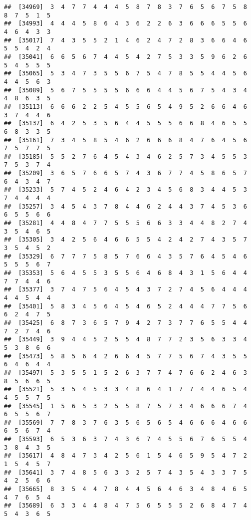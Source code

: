 \documentclass[
]{book}
\begin{document}
\begin{verbatim}
##  [34969]  3  4  7  7  4  4  4  5  8  7  8  3  7  6  5  6  7  5  8  8  7  5  1  5
##  [34993]  4  4  4  5  8  6  4  3  6  2  2  6  3  6  6  6  5  5  6  4  6  4  3  3
##  [35017]  7  4  3  5  5  2  1  4  6  2  4  7  2  8  3  6  6  4  6  5  5  4  2  4
##  [35041]  6  6  5  6  7  4  4  5  4  2  7  5  3  3  5  9  6  2  6  5  4  5  5  5
##  [35065]  5  3  4  7  3  5  5  6  7  5  4  7  8  5  5  4  4  5  6  4  4  5  6  3
##  [35089]  5  6  7  5  5  5  5  6  6  6  4  4  5  6  7  5  4  3  4  4  8  6  3  5
##  [35113]  6  6  6  2  2  5  4  5  5  6  5  4  9  5  2  6  6  4  6  3  7  4  4  6
##  [35137]  6  4  2  5  3  5  6  4  4  5  5  5  6  6  8  4  6  5  5  6  8  3  3  5
##  [35161]  7  3  4  5  8  5  4  6  2  6  6  6  8  4  7  6  4  5  6  7  5  7  7  5
##  [35185]  5  5  2  7  6  4  5  4  3  4  6  2  5  7  3  4  5  5  3  7  5  3  7  4
##  [35209]  3  6  5  7  6  6  5  7  4  3  6  7  7  4  5  8  6  5  7  6  4  3  4  7
##  [35233]  5  7  4  5  2  4  6  4  2  3  4  5  6  8  3  4  4  5  3  7  4  4  4  4
##  [35257]  3  4  5  4  3  7  8  4  4  6  2  4  4  3  7  4  5  3  6  6  5  5  6  6
##  [35281]  4  4  8  4  7  7  5  5  5  6  6  3  3  4  4  8  2  7  4  3  5  4  6  5
##  [35305]  3  4  2  5  6  4  6  6  5  5  4  2  4  2  7  4  3  5  7  3  5  4  5  2
##  [35329]  6  7  7  7  5  8  5  7  6  6  4  3  5  7  6  4  5  4  6  5  5  5  6  7
##  [35353]  5  6  4  5  5  3  5  5  6  4  6  8  4  3  1  5  6  4  4  7  7  4  4  6
##  [35377]  3  7  4  7  5  6  4  5  4  3  7  2  7  4  5  6  4  4  4  4  4  5  4  4
##  [35401]  5  8  3  4  5  6  4  5  4  6  5  2  4  4  4  7  7  5  6  6  2  4  7  5
##  [35425]  6  8  7  3  6  5  7  9  4  2  7  3  7  7  6  5  5  4  4  7  2  7  4  6
##  [35449]  3  9  4  4  5  2  5  5  4  8  7  7  2  3  5  6  3  3  4  5  3  8  6  6
##  [35473]  5  8  5  6  4  2  6  6  4  5  7  7  5  6  7  4  3  5  5  6  4  6  4  4
##  [35497]  5  3  5  5  1  5  2  6  3  7  7  4  7  6  6  2  4  6  3  8  5  6  6  5
##  [35521]  5  3  5  4  5  3  3  4  8  6  4  1  7  7  4  4  6  5  4  4  5  5  7  5
##  [35545]  1  5  6  5  3  2  5  5  8  7  5  7  3  4  6  6  6  7  4  6  5  5  6  7
##  [35569]  7  7  8  3  7  6  3  5  6  5  6  5  4  6  6  6  4  6  6  6  5  6  7  4
##  [35593]  6  5  3  6  3  7  4  3  6  7  4  5  5  6  7  6  5  5  4  3  8  4  3  5
##  [35617]  4  8  4  7  3  4  2  5  6  1  5  4  6  5  9  5  4  7  2  1  5  4  5  7
##  [35641]  3  7  4  8  5  6  3  3  2  5  7  4  3  5  4  3  3  7  5  4  2  5  6  6
##  [35665]  8  3  5  4  4  7  8  4  4  5  6  4  6  3  4  8  4  6  5  4  7  6  5  4
##  [35689]  6  3  3  4  4  8  4  7  5  6  5  5  5  2  6  8  4  7  4  5  4  3  6  5

\end{verbatim}
\end{document}
